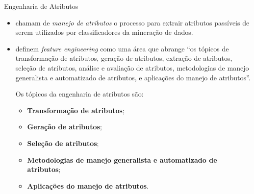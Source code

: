 \documentclass[%
  10pt,%
  aspectratio = 169,%
  compress,%
  t,%
]{beamer}%
\begin{document}
    \begin{frame}[fragile = singleslide]{}{Engenharia de Atributos}
        \begin{itemize}
            \item \cite{ZhengFEML2018} chamam de \textit{manejo de atributos} o processo para extrair atributos passíveis de serem utilizados por classificadores da mineração de dados.
            
            \item \cite[p.~3, tradução nossa]{DongFEMLDA2018} definem \textit{feature engineering} como uma área que abrange ``os tópicos de transformação de atributos, geração de atributos, extração de atributos, seleção de atributos, análise e avaliação de atributos, metodologias de manejo generalista e automatizado de atributos, e aplicações do manejo de atributos''.
            
            Os tópicos da engenharia de atributos são:
            \begin{itemize}
                \item \textbf{Transformação de atributos};
                
                \item \textbf{Geração de atributos};
                
                \item \textbf{Seleção de atributos};
                
                \item \textbf{Metodologias de manejo generalista e automatizado de atributos};
                
                \item \textbf{Aplicações do manejo de atributos}.
            \end{itemize}
        \end{itemize}
        
    \end{frame}
    
\end{document}
